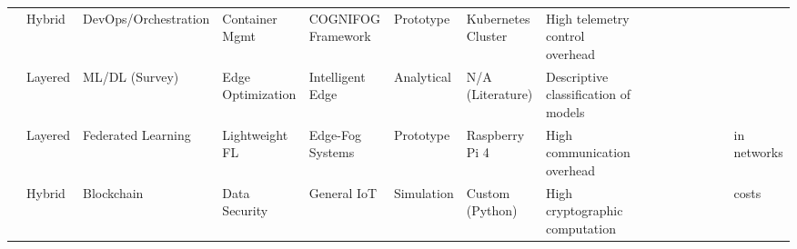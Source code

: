 \documentclass[conference]{IEEEtran}
\begin{document}
\begin{table}[p]
\begin{tabular}{llllllll}
\cite{b27} & Hybrid & DevOps/Orchestration & Container Mgmt & COGNIFOG Framework & Prototype & Kubernetes Cluster & High telemetry control overhead \\
\cite{b28} & Layered & ML/DL (Survey) & Edge Optimization & Intelligent Edge & Analytical & N/A (Literature) & Descriptive classification of models \\
\cite{b29} & Layered & Federated Learning & Lightweight FL & Edge-Fog Systems & Prototype & Raspberry Pi 4 & High communication overhead &&&&&&&& in networks \\
\cite{b30} & Hybrid & Blockchain & Data Security & General IoT & Simulation & Custom (Python) & High cryptographic computation &&&&&&&& costs \\
\bottomrule
\end{tabular}
\end{table}
\end{document}
